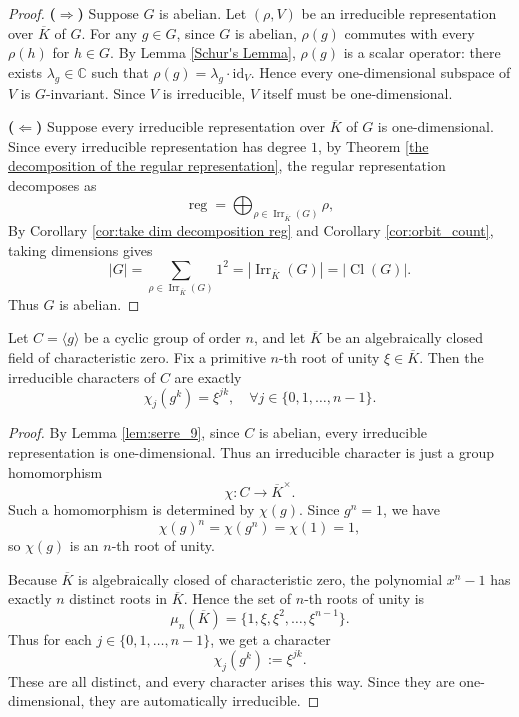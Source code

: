 \begin{proof}

\medskip
\noindent\textbf{(\(\Rightarrow\))} Suppose \(G\) is abelian. Let \((\rho, V)\) be an irreducible representation over $\overline{K}$ of \(G\). For any \(g \in G\), since \(G\) is abelian, \(\rho(g)\) commutes with every \(\rho(h)\) for \(h \in G\). By Lemma \ref{Schur's Lemma}, \(\rho(g)\) is a scalar operator: there exists \(\lambda_g \in \mathbb C\) such that \(\rho(g) = \lambda_g \cdot \mathrm{id}_V\). Hence every one-dimensional subspace of \(V\) is \(G\)-invariant. Since \(V\) is irreducible, \(V\) itself must be one-dimensional.

\medskip
\noindent\textbf{(\(\Leftarrow\))} Suppose every irreducible representation over $\overline{K}$ of \(G\) is one-dimensional. Since every irreducible representation has degree \(1\), by Theorem \ref{the decomposition of the regular representation}, the regular representation decomposes as
\[
\operatorname{reg} = \bigoplus_{\rho\in\operatorname{Irr}_{\overline{K}}(G)}\rho,
\]
By Corollary \ref{cor:take dim  decomposition reg} and Corollary \ref{cor:orbit_count}, taking dimensions gives
\[
|G| = \sum_{\rho\in\operatorname{Irr}_{\overline{K}}(G)} 1^2 = |\operatorname{Irr}_{\overline{K}}(G)|=|\operatorname{Cl}(G)|.
\]
Thus \(G\) is abelian.
\end{proof}
\begin{lemma}
\label{lem:cyclic_chars}
Let \(C = \langle g \rangle\) be a cyclic group of order \(n\), and let \(\overline K\) be an algebraically closed field of characteristic zero. Fix a primitive \(n\)-th root of unity \(\xi \in \overline K\). Then the irreducible characters of \(C\) are exactly
\[
\chi_j(g^k) = \xi^{jk}, \quad \forall j \in\{ 0, 1, \dots, n-1\}.
\]
\end{lemma}

\begin{proof}
By Lemma \ref{lem:serre_9}, since \(C\) is abelian, every irreducible representation is one-dimensional. Thus an irreducible character is just a group homomorphism
\[
\chi : C \to \overline K^\times.
\]
Such a homomorphism is determined by \(\chi(g)\). Since \(g^n = 1\), we have
\[
\chi(g)^n = \chi(g^n) = \chi(1) = 1,
\]
so \(\chi(g)\) is an \(n\)-th root of unity.

Because \(\overline K\) is algebraically closed of characteristic zero, the polynomial \(x^n - 1\) has exactly \(n\) distinct roots in \(\overline K\). Hence the set of \(n\)-th roots of unity is
\[
\mu_n(\overline K) = \{ 1, \xi, \xi^2, \dots, \xi^{n-1} \}.
\]
Thus for each \(j \in \{0, 1, \dots, n-1\}\), we get a character
\[
\chi_j(g^k) := \xi^{jk}.
\]
These are all distinct, and every character arises this way. Since they are one-dimensional, they are automatically irreducible.
\end{proof}

